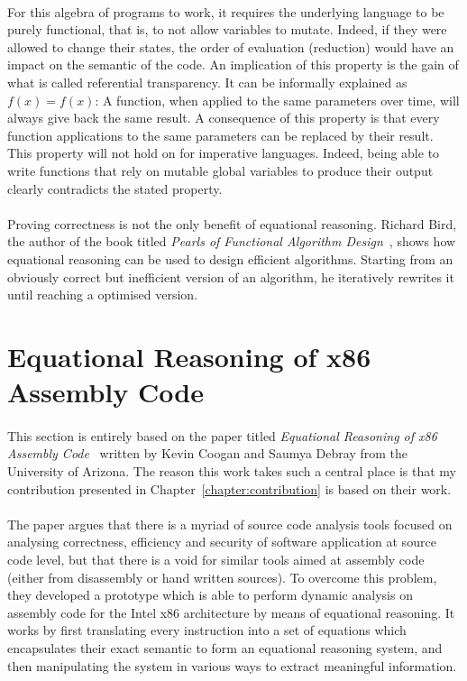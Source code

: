 \paragraph{}
For this algebra of programs to work, it requires the underlying language to be purely functional, that is, to not allow variables to mutate. Indeed, if they were allowed to change their states, the order of evaluation (reduction) would have an impact on the semantic of the code. An implication of this property is the gain of what is called referential transparency. It can be informally explained as $f(x) = f(x)$: A function, when applied to the same parameters over time, will always give back the same result. A consequence of this property is that every function applications to the same parameters can be replaced by their result. This property will not hold on for imperative languages. Indeed, being able to write functions that rely on mutable global variables to produce their output clearly contradicts the stated property.

\paragraph{}
Proving correctness is not the only benefit of equational reasoning. Richard Bird, the author of the book titled \textit{Pearls of Functional Algorithm Design}~\cite{bird2010pearls}, shows how equational reasoning can be used to design efficient algorithms. Starting from an obviously correct but inefficient version of an algorithm, he iteratively rewrites it until reaching a optimised version.

\section{Equational Reasoning of x86 Assembly Code} \label{sec:eqr_of_x86_assembly_code}
\paragraph{}
This section is entirely based on the paper titled \textit{Equational Reasoning of x86 Assembly Code}~\cite{coogan2011equational} written by Kevin Coogan and Saumya Debray from the University of Arizona. The reason this work takes such a central place is that my contribution presented in Chapter~\ref{chapter:contribution} is based on their work.

\paragraph{}
The paper argues that there is a myriad of source code analysis tools focused on analysing correctness, efficiency and security of software application at source code level, but that there is a void for similar tools aimed at assembly code (either from disassembly or hand written sources). To overcome this problem, they developed a prototype which is able to perform dynamic analysis on assembly code for the Intel x86 architecture by means of equational reasoning. It works by first translating every instruction into a set of equations which encapsulates their exact semantic to form an equational reasoning system, and then manipulating the system in various ways to extract meaningful information.

